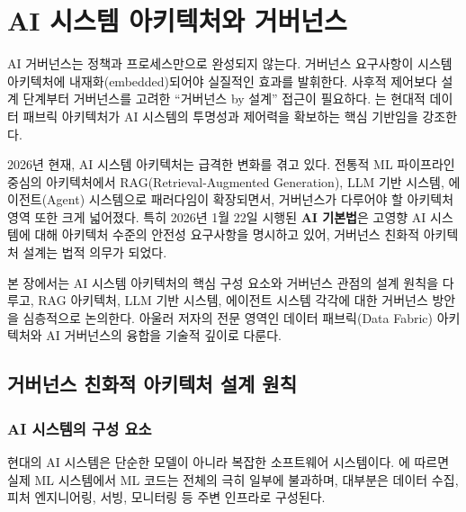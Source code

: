 
\chapter{AI 시스템 아키텍처와 거버넌스}
\label{ch:ai_architecture}

AI 거버넌스는 정책과 프로세스만으로 완성되지 않는다. 거버넌스 요구사항이 시스템 아키텍처에 내재화(embedded)되어야 실질적인 효과를 발휘한다. 사후적 제어보다 설계 단계부터\cite{li2023trustworthy} 거버넌스를 고려한 ``거버넌스 by 설계'' 접근이 필요하다. \cite{gartner2021datafabric}는 현대적 데이터 패브릭 아키텍처가 AI 시스템의 투명성과 제어력을 확보하는 핵심 기반임을 강조한다.

2026년 현재, AI 시스템 아키텍처는 급격한 변화를 겪고 있다. 전통적 ML 파이프라인 중심의 아키텍처에서 RAG(Retrieval-Augmented Generation), LLM 기반 시스템, 에이전트\cite{wei2022emergent}(Agent) 시스템으로 패러다임이 확장되면서, 거버넌스가 다루어야 할 아키텍처 영역 또한 크게 넓어졌다. 특히 2026년 1월 22일 시행된 \textbf{AI 기본법}은 고영향 AI 시스템에 대해 아키텍처 수준의 안전성 요구사항\cite{ebers2021european}을 명시하고 있어, 거버넌스 친화적 아키텍처 설계는 법적 의무\cite{cset2025korea_ai_act}가 되었다.

본 장에서는 AI 시스템 아키텍처의 핵심 구성 요소와 거버넌스 관점의 설계 원칙\cite{amershi2019software}을 다루고, RAG 아키텍처, LLM 기반 시스템, 에이전트 시스템 각각에 대한 거버넌스 방안을 심층적으로 논의한다. 아울러 저자의 전문 영역인 데이터 패브릭(Data Fabric) 아키텍처와 AI 거버넌스의 융합을 기술적 깊이로 다룬다.

\section{거버넌스 친화적 아키텍처 설계 원칙}
\label{sec:13.1}

\subsection{AI 시스템의 구성 요소}
\label{sec:13.1.1}

현대의 AI 시스템은 단순한 모델이 아니라 복잡한 소프트웨어 시스템이다. \cite{sculley2015hidden}에 따르면 실제 ML 시스템에서 ML 코드는 전체의 극히 일부에 불과하며, 대부분은 데이터 수집, 피처 엔지니어링, 서빙, 모니터링 등 주변 인프라로 구성된다.

